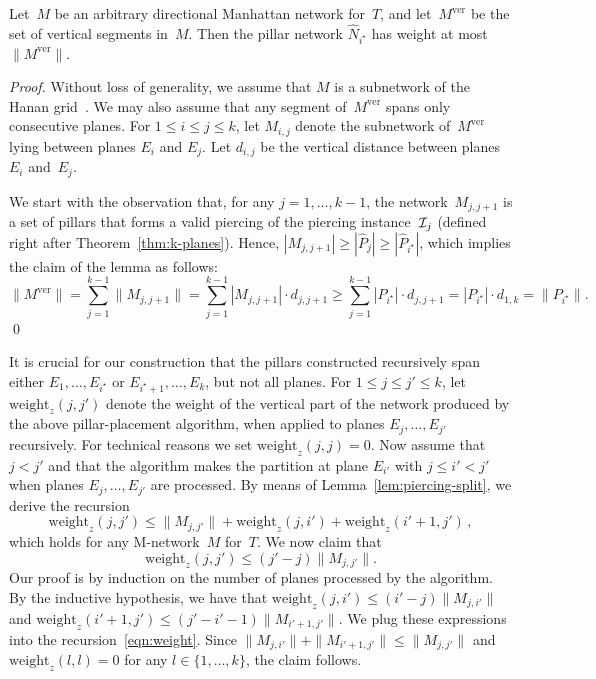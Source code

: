 \documentclass[11pt]{llncs}
\newcommand{\Mver}{\ensuremath{M^\mathrm{ver}}\xspace}
\newcommand{\cost}{\ensuremath{\mathrm{weight}}\xspace}
\newenvironment{pf}{\begin{proof}}{\qed\end{proof}}
\begin{document}
\begin{lemma}
  \label{lem:piercing-split}
Let~$M$ be an
  arbitrary directional Manhattan network for~$T$, and let~\Mver be 
  the set of vertical segments in~$M$.  Then the pillar network
  $\hat{N}_{i^\star}$ has weight at most $\|\Mver\|$.  
\end{lemma}

\begin{pf}
  Without loss of generality, we assume that $M$ is a subnetwork of 
  the Hanan grid~\cite{gln-ammn-01}.  We may also assume that any
  segment of~\Mver spans only 
  consecutive planes. For $1\leq i\leq j\leq k$, let $M_{i,j}$
  denote the subnetwork of~\Mver lying between planes $E_i$ and $
  E_j$.  Let $d_{i,j}$ be the vertical distance between planes~$E_i$
  and~$E_j$.

  We start with the observation that, for any $j=1,\ldots,k-1$, the
  network~$M_{j,j+1}$ is a set of pillars that forms a valid piercing
  of the piercing instance~${\cal I}_j$ (defined right after
  Theorem~\ref{thm:k-planes}).  Hence, $|M_{j,j+1}| \ge |\hat{P}_j| 
  \ge |\hat{P}_{i^\star}|$, which implies the claim of the lemma
  as follows:
  \begin{displaymath}
    \|\Mver\|=\sum_{j=1}^{k-1}\|M_{j,j+1}\|=\sum_{j=1}^{k-1}|M_{j,j+1}|
    \cdot d_{j,j+1} \ge \sum_{j=1}^{k-1}|P_{i^\star}| \cdot d_{j,j+1} =
    |P_{i^\star}| \cdot d_{1,k} = 
    \|P_{i^\star}\|.   
  \end{displaymath}
\end{pf}

It is crucial for our construction that the pillars constructed
recursively span either 
$E_1,\dots,E_{i^\star}$ or $E_{i^\star+1},\dots,E_k$, but not all
planes.
For $1\leq j\leq j'\leq k$, let $\cost_z(j,j')$ denote the weight of
the vertical part of the network produced by the above
pillar-placement algorithm, when applied to planes $E_j,\dots,E_{j'}$
recursively.  For technical reasons we set ${\cost_z(j,j)=0}$.  Now assume that $j<j'$ and that the algorithm makes the partition at
plane $E_{i'}$ with $j\leq i'< j'$ when planes $E_j,\dots,E_{j'}$ are
processed.  By means of Lemma~\ref{lem:piercing-split}, we derive the
recursion 
\begin{equation}
  \label{eqn:weight}
  \cost_z(j,j')\leq \|M_{j,j'}\|+\cost_z(j,i')+\cost_z(i'+1,j')\, ,
\end{equation}
which holds for any M-network~$M$ for~$T$.  We now claim that
\begin{displaymath}
  \cost_z(j,j')\leq (j'-j)\|M_{j,j'}\|.
\end{displaymath}
Our proof is by induction on the number of planes processed by the
algorithm.  By the inductive hypothesis, we have that
$\cost_z(j,i')\leq(i'-j)\|M_{j,i'}\|$ and
$\cost_z(i'+1,j')\leq(j'-i'-1)\|M_{i'+1,j'}\|$.  
We plug these expressions into the recursion~\ref{eqn:weight}.
Since
$\|M_{j,i'}\|+\|M_{i'+1,j'}\|\leq \|M_{j,j'}\|$ and 
$\cost_z(l,l)=0$ for any $l\in\{1,\dots,k\}$, the claim follows.  
\end{document}

